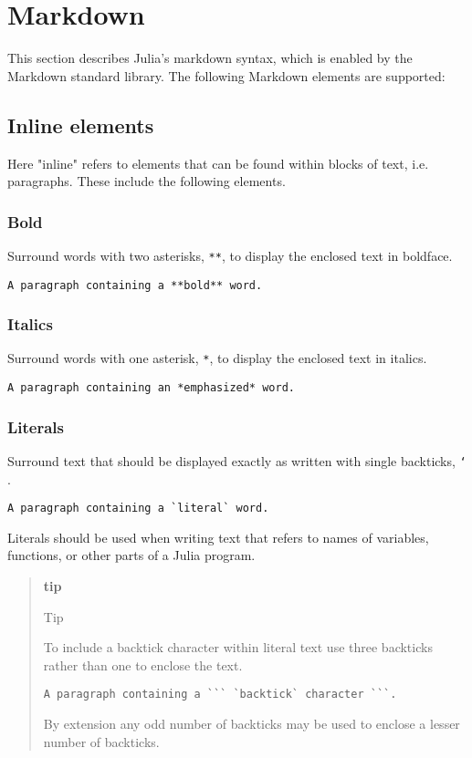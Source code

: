\section{Markdown}
This section describes Julia's markdown syntax, which is enabled by the Markdown standard library. The following Markdown elements are supported:

\subsection{Inline elements}
Here "inline" refers to elements that can be found within blocks of text, i.e. paragraphs. These include the following elements.

\subsubsection{Bold}
Surround words with two asterisks, \texttt{**}, to display the enclosed text in boldface.

\begin{verbatim}
A paragraph containing a **bold** word.
\end{verbatim}
\subsubsection{Italics}
Surround words with one asterisk, \texttt{*}, to display the enclosed text in italics.

\begin{verbatim}
A paragraph containing an *emphasized* word.
\end{verbatim}
\subsubsection{Literals}
Surround text that should be displayed exactly as written with single backticks, \texttt{`} .

\begin{verbatim}
A paragraph containing a `literal` word.
\end{verbatim}
Literals should be used when writing text that refers to names of variables, functions, or other parts of a Julia program.

\begin{quote}
\textbf{tip}

Tip

To include a backtick character within literal text use three backticks rather than one to enclose the text.

\begin{verbatim}
A paragraph containing a ``` `backtick` character ```.
\end{verbatim}
By extension any odd number of backticks may be used to enclose a lesser number of backticks.

\end{quote}
